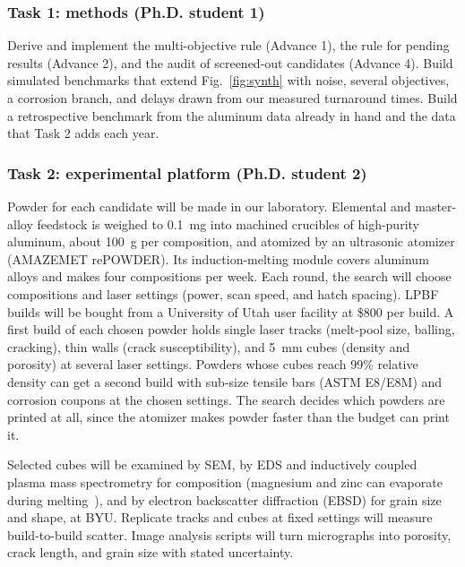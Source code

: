 \documentclass[12pt,letterpaper]{article}
\begin{document}
\subsubsection{Task 1: methods (Ph.D. student 1)}
Derive and implement the multi-objective rule (Advance 1), the rule for
pending results (Advance 2), and the audit of screened-out candidates
(Advance 4). Build simulated benchmarks that extend Fig.~\ref{fig:synth}
with noise, several objectives, a corrosion branch, and delays drawn from our
measured turnaround times. Build a retrospective benchmark from the aluminum
data already in hand and the data that Task 2 adds each year.

\subsubsection{Task 2: experimental platform (Ph.D. student 2)}
Powder for each candidate will be made in our laboratory. Elemental and
master-alloy feedstock is weighed to 0.1~mg into machined crucibles of
high-purity aluminum, about 100~g per composition, and atomized by an
ultrasonic atomizer (AMAZEMET rePOWDER). Its induction-melting module covers
aluminum alloys and makes four compositions per week. Each round, the search
will choose compositions and laser settings (power, scan speed, and hatch
spacing). LPBF builds will be bought from a University of Utah user facility
at \$800 per build. A first build of each chosen powder holds single laser
tracks (melt-pool size, balling, cracking), thin walls (crack
susceptibility), and 5~mm cubes (density and porosity) at several laser
settings. Powders whose cubes reach 99\% relative density can get a second
build with sub-size tensile bars (ASTM E8/E8M) and corrosion coupons at the
chosen settings. The search decides which powders are printed at all, since
the atomizer makes powder faster than the budget can print it.

Selected cubes will be examined by SEM, by EDS and inductively coupled plasma
mass spectrometry for composition (magnesium and zinc can evaporate during
melting~\cite{debroy2018}), and by electron backscatter diffraction (EBSD)
for grain size and shape, at BYU. Replicate tracks and cubes at fixed settings
will measure build-to-build scatter. Image analysis scripts will turn
micrographs into porosity, crack length, and grain size with stated
uncertainty.
\end{document}
